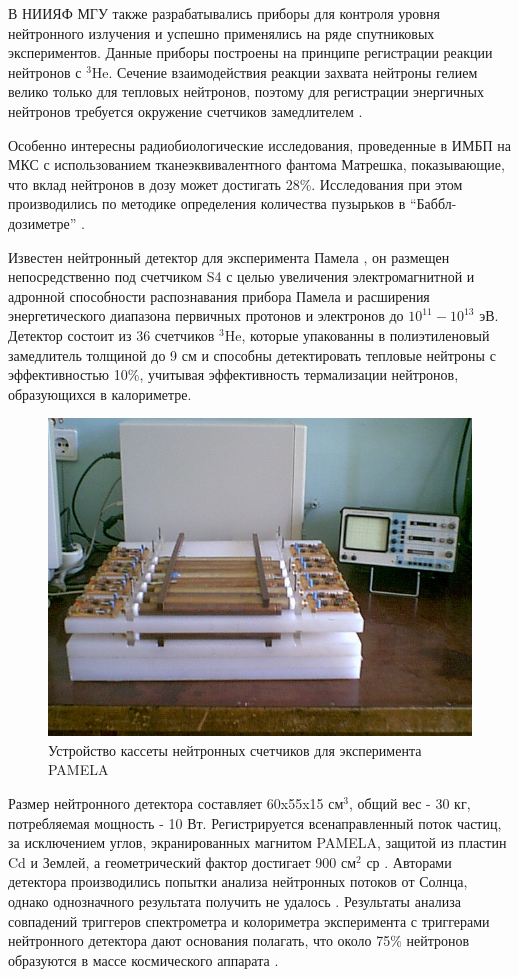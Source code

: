  В НИИЯФ МГУ также разрабатывались приборы для контроля уровня нейтронного излучения \cite{Shavrin1990} и успешно применялись на ряде спутниковых экспериментов. Данные приборы построены на принципе регистрации реакции нейтронов с $ ^{3} $He. Сечение взаимодействия реакции захвата нейтроны гелием велико только для тепловых нейтронов, поэтому для регистрации энергичных нейтронов требуется окружение счетчиков замедлителем \cite{Shavrin2002}.

Особенно интересны радиобиологические исследования, проведенные в ИМБП \cite{Shurshakov2016} на МКС с использованием тканеэквивалентного фантома Матрешка, показывающие, что вклад нейтронов в дозу может достигать 28\%.  Исследования при этом производились по методике определения количества пузырьков в ``Баббл-дозиметре'' \cite{hulapko2016}.


Известен нейтронный детектор для эксперимента Памела \cite{Menn2013}, он размещен непосредственно под счетчиком S4 с целью увеличения электромагнитной и адронной способности распознавания прибора Памела и расширения энергетического диапазона первичных протонов и электронов до $ 10^{11}-10^{13} $ эВ. Детектор состоит из 36 счетчиков  $ ^{3} $He, которые упакованны в полиэтиленовый замедлитель толщиной до 9 см и способны детектировать тепловые нейтроны с эффективностью 10\%, учитывая эффективность термализации нейтронов, образующихся в калориметре.

\begin{figure}
	\centering
	\includegraphics[width=0.7\linewidth]{images/neutrons/pamela}
	\caption{Устройство кассеты нейтронных счетчиков для эксперимента PAMELA \cite{Stozhkov2007}}
	\label{fig:pamela}
\end{figure}

Размер нейтронного детектора составляет 60x55x15 см$ ^3 $, общий вес - 30 кг, потребляемая мощность - 10 Вт. Регистрируется всенаправленный поток частиц, за исключением углов, экранированных магнитом PAMELA, защитой из пластин Cd и Землей, а геометрический фактор достигает 900 см$ ^2 $ ср \cite{Stozhkov2007}. Авторами детектора производились попытки анализа нейтронных потоков от Солнца, однако однозначного результата получить не удалось \cite{Goryacheva2016}. Результаты анализа совпадений триггеров спектрометра и колориметра эксперимента с триггерами нейтронного детектора дают основания полагать, что около 75\% нейтронов образуются в массе космического аппарата \cite{Stozhkov2007}.

